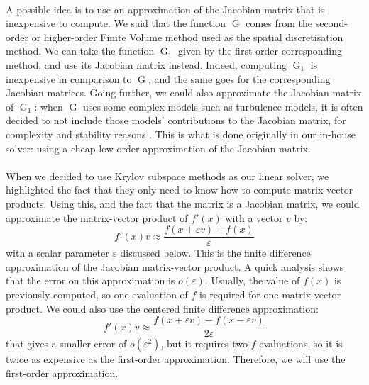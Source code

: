       \paragraph{}
      A possible idea is to use an approximation of the Jacobian matrix that is inexpensive to compute.
      We said that the function $\operatorname{G}$ comes from the second-order or higher-order Finite Volume method used as the spatial discretisation method.
      We can take the function $\operatorname{G}_1$ given by the first-order corresponding method, and use its Jacobian matrix instead.
      Indeed, computing $\operatorname{G}_1$ is inexpensive in comparison to $\operatorname{G}$, and the same goes for the corresponding Jacobian matrices.
      Going further, we could also approximate the Jacobian matrix of $\operatorname{G}_1$: when $\operatorname{G}$ uses some complex models such as turbulence models, it is often decided to not include those models' contributions to the Jacobian matrix, for complexity and stability reasons \cite{ContentOuttierCinnella2013}.
      This is what is done originally in our in-house solver: using a cheap low-order approximation of the Jacobian matrix.

      \paragraph{}
      When we decided to use Krylov subspace methods as our linear solver, we highlighted the fact that they only need to know how to compute matrix-vector products.
      Using this, and the fact that the matrix is a Jacobian matrix, we could approximate the matrix-vector product of $f'\left(x\right)$ with a vector $v$ by:
      \begin{equation}\label{eq:matrix_free}
        f'\left(x\right) v \approx \frac{f\left(x + \varepsilon v\right) - f\left(x\right)}{\varepsilon}
      \end{equation}
      with a scalar parameter $\varepsilon$ discussed below.
      This is the finite difference approximation of the Jacobian matrix-vector product.
      A quick analysis shows that the error on this approximation is $o\left(\varepsilon\right)$.
      Usually, the value of $f\left(x\right)$ is previously computed, so one evaluation of $f$ is required for one matrix-vector product.
      We could also use the centered finite difference approximation:
      \begin{equation}
        f'\left(x\right) v \approx \frac{f\left(x + \varepsilon v\right) - f\left(x - \varepsilon v\right)}{2\varepsilon}
      \end{equation}
      that gives a smaller error of $o\left(\varepsilon^2\right)$, but it requires two $f$ evaluations, so it is twice as expensive as the first-order approximation.
      Therefore, we will use the first-order approximation.

